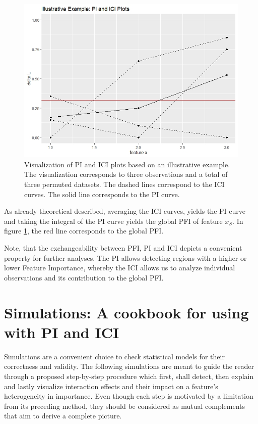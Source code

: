 \documentclass[]{krantz}
\begin{document}
\begin{figure}

{\centering \includegraphics[width=0.99\linewidth]{images/03-7-0} 

}

\caption{Visualization of PI and ICI plots based on an illustrative example. The visualization corresponds to three observations and a total of three permuted datasets. The dashed lines correspond to the ICI curves. The solid line corresponds to the PI curve.}\label{fig:fig0}
\end{figure}

As already theoretical described, averaging the ICI curves, yields the
PI curve and taking the integral of the PI curve yields the global PFI
of feature \(x_{S}\). In figure \ref{fig:fig0}, the red line corresponds
to the global PFI.

Note, that the exchangeability between PFI, PI and ICI depicts a
convenient property for further analyses. The PI allows detecting
regions with a higher or lower Feature Importance, whereby the ICI
allows us to analyze individual observations and its contribution to the
global PFI.

\section{Simulations: A cookbook for using with PI and ICI}\label{ch3}

Simulations are a convenient choice to check statistical models for
their correctness and validity. The following simulations are meant to
guide the reader through a proposed step-by-step procedure which first,
shall detect, then explain and lastly visualize interaction effects and
their impact on a feature's heterogeneity in importance. Even though
each step is motivated by a limitation from its preceding method, they
should be considered as mutual complements that aim to derive a complete
picture.
\end{document}
